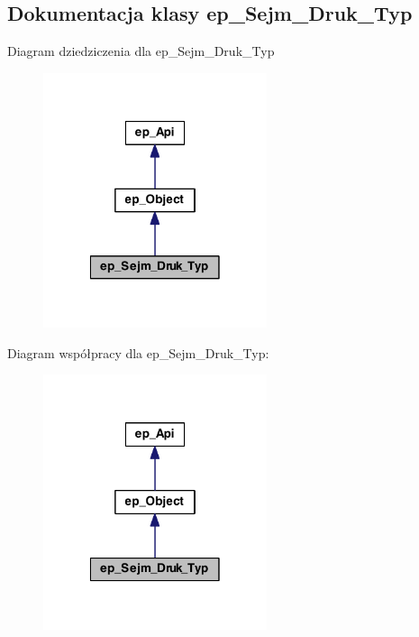 \hypertarget{classep___sejm___druk___typ}{\subsection{Dokumentacja klasy ep\-\_\-\-Sejm\-\_\-\-Druk\-\_\-\-Typ}
\label{classep___sejm___druk___typ}
}


Diagram dziedziczenia dla ep\-\_\-\-Sejm\-\_\-\-Druk\-\_\-\-Typ\nopagebreak
\begin{figure}[H]
\begin{center}
\leavevmode
\includegraphics[width=186pt]{classep___sejm___druk___typ__inherit__graph}
\end{center}
\end{figure}


Diagram współpracy dla ep\-\_\-\-Sejm\-\_\-\-Druk\-\_\-\-Typ\-:\nopagebreak
\begin{figure}[H]
\begin{center}
\leavevmode
\includegraphics[width=186pt]{classep___sejm___druk___typ__coll__graph}
\end{center}
\end{figure}

